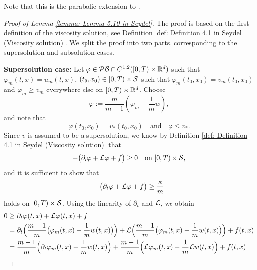 \begin{remark}
    Note that this is the parabolic extension to {\cite[Lemma 5.10]{seydel2010generalexistenceuniquenessviscosity}}.
\end{remark}
\begin{proof}[Proof of Lemma \ref{lemma: Lemma 5.10 in Seydel}]
    The proof is based on the first definition of the viscosity solution, see Definition \ref{def: Definition 4.1 in Seydel (Viscosity solution)}. We split the proof into two parts, corresponding to the supersolution and subsolution cases.

    \textbf{Supersolution case:} Let $\varphi \in \mathcal{PB} \cap C^{1,2}([0,T) \times \mathbb{R}^d)$ such that $\varphi_m(t,x) = u_m(t,x)$, $(t_0,x_0) \in [0,T) \times \mathcal{S}$ such that $\varphi_m(t_0,x_0) = v_m(t_0,x_0)$ and $\varphi_m \geq v_m$ everywhere else on $[0,T) \times \mathbb{R}^d$.  Choose 
    \begin{equation*}
        \varphi := \frac{m}{m-1} \left( \varphi_m -  \frac 1 m w \right),
    \end{equation*}
    and note that 
    \begin{equation*}
        \varphi(t_0,x_0) = v_*(t_0,x_0) \quad \text{and} \quad \varphi \leq v_*.
    \end{equation*}
    Since $v$ is assumed to be a supersolution, we know by Definition \ref{def: Definition 4.1 in Seydel (Viscosity solution)} that
    \begin{equation*}
        - \big( \partial_t \varphi + \mathcal{L} \varphi + f\big) \geq 0 \quad \text{on } [0,T) \times \mathcal{S},
    \end{equation*}
    and it is sufficient to show that
    \begin{equation*}
        -\big(\partial_t \varphi + \mathcal{L} \varphi + f \big) \geq \frac{\kappa}{m}
    \end{equation*}
    holds on $[0,T) \times \mathcal{S}$. Using the linearity of $\partial_t$ and $\mathcal{L}$, we obtain
    \begin{equation*}
        \begin{aligned}
            0 &\geq \partial_t \varphi(t,x) + \InfinitesimalGenerator \varphi(t,x) + f \\
            &= \partial_t \Big( \frac{m-1}{m} \big( \varphi_m(t,x) - \frac 1 m w(t,x) \big) \Big) + \InfinitesimalGenerator \Big( \frac{m-1}{m} \big( \varphi_m(t,x) - \frac 1 m w(t,x) \big) \Big) + f(t,x) \\
            &= \frac{m-1}{m} \Big( \partial_t \varphi_m(t,x) - \frac 1 m w (t,x) \Big) + \frac{m-1}{m} \Big( \InfinitesimalGenerator \varphi_m(t,x) - \frac{1}{m} \InfinitesimalGenerator w(t,x) \Big) + f(t,x) 

\end{aligned}
\end{equation*}
\end{proof}
